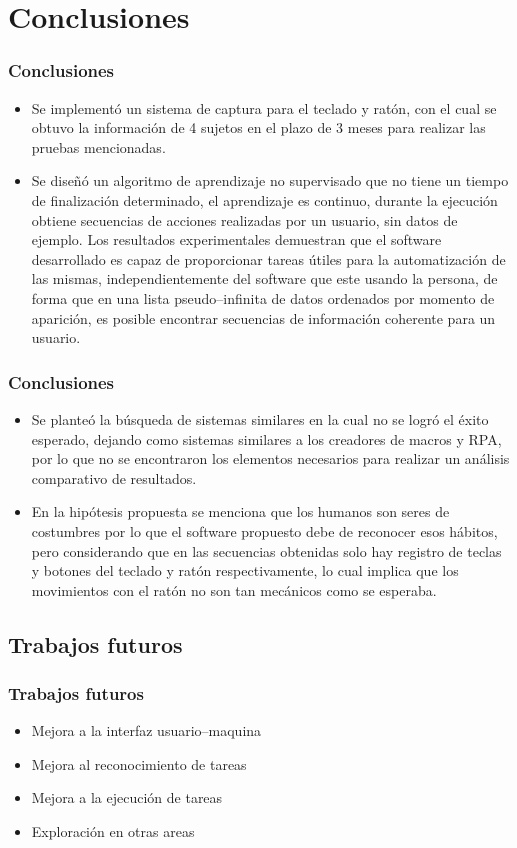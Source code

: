\section{Conclusiones}

\begin{frame}
\frametitle{Conclusiones}
\begin{itemize}
\item {
Se implement\'o un sistema de captura para el teclado y rat\'on, con el cual
 se obtuvo la informaci\'on de 4 sujetos en el plazo de 3 meses para 
 realizar las pruebas mencionadas.
}
\item {
Se dise\~n\'o un algoritmo de aprendizaje no supervisado que no tiene un
 tiempo de finalizaci\'on determinado, el aprendizaje es continuo, durante la 
 ejecuci\'on obtiene secuencias de acciones realizadas por un usuario, sin 
 datos de ejemplo. Los resultados experimentales demuestran que el software 
 desarrollado es capaz de proporcionar tareas \'utiles para la 
 automatizaci\'on de las mismas, independientemente del software que este 
 usando la persona, de forma que en una lista pseudo--infinita de datos 
 ordenados por momento de aparici\'on, es posible encontrar secuencias de 
 informaci\'on coherente para un usuario.
}
\end{itemize}
\end{frame}

\begin{frame}
\frametitle{Conclusiones}
\begin{itemize}
\item{
Se plante\'o la b\'usqueda de sistemas similares en la cual no se logr\'o 
 el \'exito esperado, dejando como sistemas similares a los creadores de
 macros y RPA, por lo que no se encontraron los elementos necesarios 
 para realizar un an\'alisis comparativo de resultados.
}
\item {
En la hip\'otesis propuesta se menciona que los humanos son seres de 
 costumbres por lo que el software propuesto debe de reconocer esos h\'abitos, 
 pero considerando que en las secuencias obtenidas solo hay registro de teclas
 y botones del teclado y rat\'on respectivamente, lo cual implica que los
 movimientos con el rat\'on no son tan mec\'anicos como se esperaba.
}
\end{itemize}
\end{frame}


\subsection{Trabajos futuros}
\begin{frame}
\frametitle{Trabajos futuros}

\begin{itemize}
	\item Mejora a la interfaz usuario--maquina
	\item Mejora al reconocimiento de tareas
	\item Mejora a la ejecuci\'on de tareas
	\item Exploraci\'on en otras areas
\end{itemize}

\end{frame}


